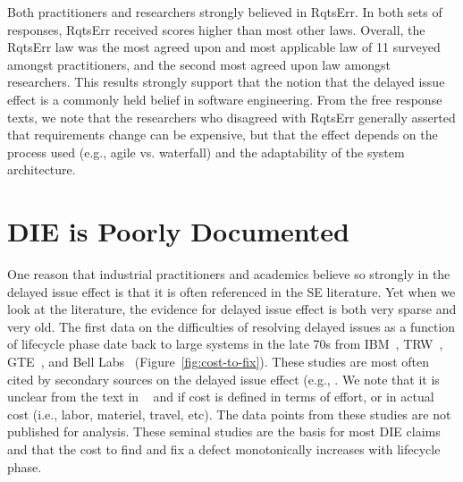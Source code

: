\documentclass[smallcondensed]{svjour3}
\newcommand{\fig}[1]{Figure~\ref{fig:#1}}
\begin{document}
Both  practitioners and researchers strongly believed in RqtsErr. In both sets of responses, RqtsErr received  scores higher than most
other laws. Overall, the RqtsErr law was the most agreed upon and most applicable law of 11 surveyed amongst practitioners, and the second most agreed upon law amongst researchers. 
This results strongly support that the notion that the  delayed issue effect   is a commonly held belief in software engineering. From the free response texts, we note that the researchers who disagreed with RqtsErr generally asserted that requirements change can be expensive, but that the effect depends on the process used (e.g., agile vs. waterfall) and the adaptability of the system architecture.



\section{DIE is Poorly  Documented}\label{sect:doco}
 
One reason that industrial practitioners and academics believe so strongly in the delayed issue effect is that it is often referenced
in the SE literature. 
Yet when we look at the literature, the evidence for
delayed issue effect is both very sparse and very old.
The first data on the difficulties of resolving delayed issues as a function of lifecycle phase date back to large systems in the late 70s from IBM~\cite{Fagan76}, TRW~\cite{Boehm76}, GTE~\cite{Daly77}, and Bell Labs~\cite{Stephenson76} (Figure~\ref{fig:cost-to-fix}). These studies are most often cited by secondary sources on the delayed issue effect (e.g., \cite{boehm01, mcconnell01,glass02}. We note that it is unclear from the text in ~\cite{Daly77} and \cite{Boehm76} if cost is defined in terms of effort, or in actual cost (i.e., labor, materiel, travel, etc). The data points from these studies are not published for analysis. These seminal studies are the basis for most DIE claims and that the cost to find and fix a defect monotonically increases with lifecycle phase.  
\end{document}
